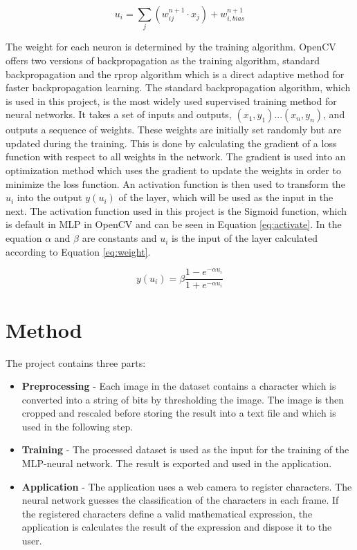 \documentclass[12pt]{report}
\begin{document}
\begin{equation}
  \label{eq:weight}
  u_{i}=\sum_{j}(w_{ij}^{n+1}\cdot x_{j}) + w_{i,bias}^{n+1}
\end{equation}

The weight for each neuron is determined by the training algorithm. OpenCV offers two versions of backpropagation as the training algorithm, standard backpropagation and the rprop algorithm which is a direct adaptive method for faster backpropagation learning. The standard backpropagation algorithm, which is used in this project, is the most widely used supervised training method for neural networks. It takes a set of inputs and outputs, $(x_1, y_1)...(x_n,y_n)$, and outputs a sequence of weights. These weights are initially set randomly but are updated during the training. This is done by calculating the gradient of a loss function with respect to all weights in the network. The gradient is used into an optimization method which uses the gradient to update the weights in order to minimize the loss function. 
\newline
\newline
An activation function is then used to transform the $u_{i}$ into the output $y(u_{i})$  of the layer, which will be used as the input in the next. The activation function used in this project is the Sigmoid function, which is default in MLP in OpenCV and can be seen in Equation \ref{eq:activate}. In the equation $\alpha$ and $\beta$ are constants and $u_{i}$ is the input of the layer calculated according to Equation \ref{eq:weight}.


\begin{equation}
  \label{eq:activate}
  y(u_{i})= \beta \frac{1 - e^{-\alpha u_{i}}}{1 + e^{-\alpha u_{i}}}
\end{equation}



\section*{Method}

The project contains three parts:

\begin{itemize}  
\item \textbf{Preprocessing} -  Each image in the dataset contains a character which is converted into a string of bits by thresholding the image. The image is then cropped and rescaled before storing the result into a text file and which is used in the following step. 
\item \textbf{Training} - The processed dataset is used as the input for the training of the MLP-neural network. The result is exported and used in the application.
\item \textbf{Application} - The application uses a web camera to register characters. The neural network guesses the classification of the characters in each frame. If the registered characters define a valid mathematical expression, the application is calculates the result of the expression and dispose it to the user.
\end{itemize}
\end{document}
